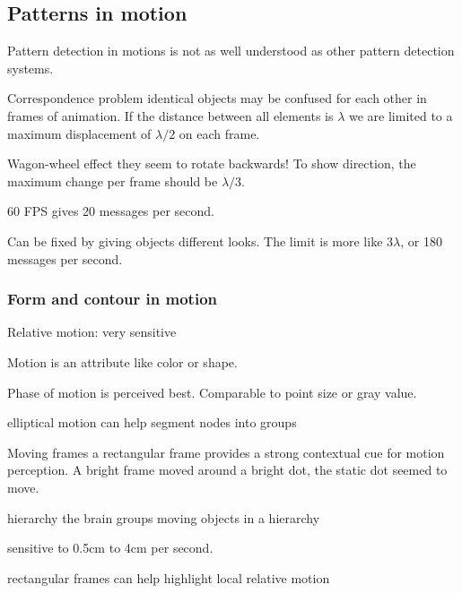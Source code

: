 \begin{mdframed}\begin{multicols}{2}
\subsection{Patterns in motion}
\begin{compactdesc}
    \item[Pattern detection in motions] is not as well understood as other
        pattern detection systems.
    \item[Correspondence problem] identical objects may be confused for
        each other in frames of animation. If the distance between all
        elements is $\lambda$ we are limited to a maximum displacement of
        $\lambda / 2$ on each frame.
    \item[Wagon-wheel effect] they seem to rotate backwards! To show
        direction, the maximum change per frame should be $\lambda / 3$.
    \item[60 FPS] gives 20 messages per second.
    \item[Can be fixed] by giving objects different looks. The limit is more
        like $3 \lambda$, or 180 messages per second.
\end{compactdesc}
    \subsubsection{Form and contour in motion}
\begin{compactdesc}
    \item[Relative motion:] very sensitive
    \item[Motion is an attribute] like color or shape.
    \item[Phase of motion] is perceived best. Comparable to point size or
        gray value.
    \item[elliptical motion] can help segment nodes into groups
    \item[Moving frames] a rectangular frame provides a strong contextual
        cue for motion perception. A bright frame moved around a bright dot,
        the static dot seemed to move.
    \item[hierarchy] the brain groups moving objects in a hierarchy
    \item[sensitive] to 0.5cm to 4cm per second.
    \item[rectangular frames] can help highlight local relative motion
\end{compactdesc}


\end{multicols}
\end{mdframed}
